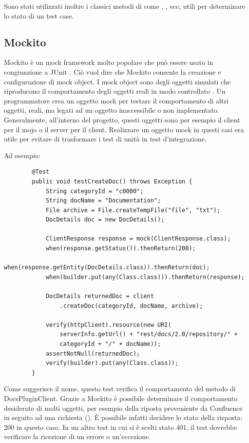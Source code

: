     Sono stati utilizzati inoltre i classici metodi di  come , ,  ecc, utili per determinare lo stato di un test case.

    \subsection{Mockito}
    Mockito è un mock framework molto popolare che può essere usato in congiunzione a JUnit \cite{site:mockito}. 
    Ciò vuol dire che Mockito consente la creazione e configurazione di mock object.
    I mock object sono degli oggetti simulati che riproducono il comportamento degli oggetti reali in modo controllato \cite{site:mock}.
    Un programmatore crea un oggetto mock per testare il comportamento di altri oggetti, reali, ma legati ad un oggetto inaccessibile o non implementato.
    Generalmente, all'interno del progetto, questi oggetti sono per esempio il client per il mojo o il server per il client.
    Realizzare un oggetto mock in questi casi era utile per evitare di trasformare i test di unità in test d'integrazione.

    Ad esempio:

    \begin{lstlisting} 
        @Test
        public void testCreateDoc() throws Exception {
            String categoryId = "c0000";
            String docName = "Documentation";
            File archive = File.createTempFile("file", "txt");
            DocDetails doc = new DocDetails();

            ClientResponse response = mock(ClientResponse.class);
            when(response.getStatus()).thenReturn(200);
            when(response.getEntity(DocDetails.class)).thenReturn(doc);
            when(builder.put(any(Class.class))).thenReturn(response);

            DocDetails returnedDoc = client
                .createDoc(categoryId, docName, archive);

            verify(httpClient).resource(new URI(
                serverInfo.getUrl() + "rest/docs/2.0/repository/" + 
                categoryId + "/" + docName));
            assertNotNull(returnedDoc);
            verify(builder).put(any(Class.class));
        }
    \end{lstlisting}
    Come suggerisce il nome, questo test verifica il comportamento del metodo  di DocsPluginClient.
    Grazie a Mockito è possibile determinare il comportamento desiderato di molti oggetti, per esempio della riposta proveniente da Confluence in seguito ad una richiesta ().
    È possibile infatti decidere lo stato della risposta: 200 in questo caso.
    In un altro test in cui si è scelti stato 401, il test dovrebbe verificare la ricezione di un errore o un'eccezione.

